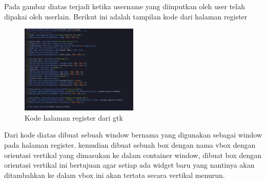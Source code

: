 \documentclass[a4paper,12pt]{article}
\begin{document}
\FloatBarrier
Pada gambar diatas terjadi ketika username yang diinputkan oleh user telah dipakai oleh userlain.
\FloatBarrier
Berikut ini adalah tampilan kode dari halaman register
\begin{figure}[!htbp]
    \centering
    \includegraphics[width=0.5\textwidth]{./img/kode_halaman_register_gtk.png}
    \caption{Kode halaman register dari gtk}
\end{figure}
\FloatBarrier
Dari kode diatas dibuat sebuah window bernama \texttt{} yang digunakan
sebagai window pada halaman register. kemudian dibuat sebuah box dengan nama vbox dengan orientasi vertikal yang dimasukan ke dalam container window,
dibuat box dengan orientasi vertikal ini bertujuan agar setiap ada widget baru yang nantinya akan ditambahkan ke dalam
vbox ini akan tertata secara vertikal menurun.
\end{document}
